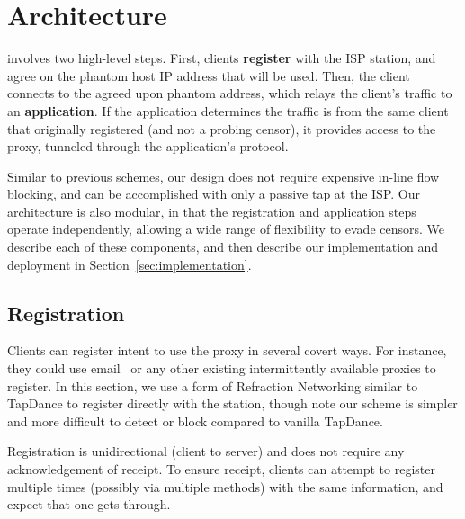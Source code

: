 \documentclass[sigconf]{acmart}
\begin{document}


\section{Architecture}
\label{sec:architecture}

\scheme involves two high-level steps. First, clients \textbf{register} with the
ISP station,
and agree on the phantom host IP address that will be used. Then, the client
connects to the agreed upon phantom address, which relays the client's traffic
to an \textbf{application}. If the application determines the traffic is from
the same client that originally registered (and not a probing censor), it
provides access to the proxy, tunneled through the application's protocol.

Similar to previous schemes, our design does not require expensive in-line
flow blocking, and can be accomplished with only a passive tap at the ISP.
Our architecture is also modular, in that the registration and application steps operate
independently, allowing a wide range of flexibility to evade censors. We
describe each of these components, and then describe our implementation and
deployment in Section~\ref{sec:implementation}.

\subsection{Registration}
\label{sec:registration}
Clients can register intent to use the proxy in several covert ways. For
instance, they could use email~\cite{SWEET-ToN} or any other existing intermittently
available proxies
to register. In this section, we use a form of Refraction Networking similar to
TapDance to register directly with the station, though note our scheme is simpler and more
difficult to detect or block compared to vanilla TapDance.

Registration is unidirectional (client to server) and does not require any
acknowledgement of receipt. To ensure receipt, clients can attempt to register
multiple times (possibly via multiple methods) with the same information, and expect
that one gets through.
\end{document}
